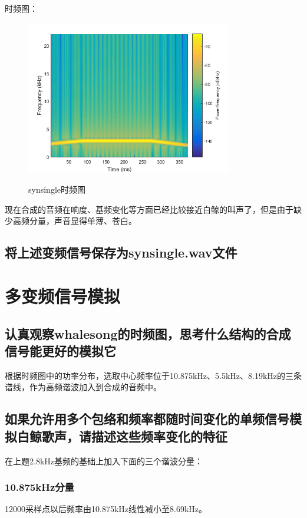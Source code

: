 \documentclass{article}
\begin{document}
            时频图：
            \begin{figure}[H]
                \centering
                \includegraphics[width=9cm]{figure9.png}
                \label{fig:synsingle-ft}\caption{synsingle时频图}
            \end{figure}
            
            现在合成的音频在响度、基频变化等方面已经比较接近白鲸的叫声了，但是由于缺少高频分量，声音显得单薄、苍白。
            
        \subsection{将上述变频信号保存为synsingle.wav文件}
        
    \section{多变频信号模拟}
        \subsection{认真观察whalesong的时频图，思考什么结构的合成信号能更好的模拟它}
            根据时频图中的功率分布，选取中心频率位于10.875kHz、5.5kHz、8.19kHz的三条谱线，作为高频谐波加入到合成的音频中。
            
        \subsection{如果允许用多个包络和频率都随时间变化的单频信号模拟白鲸歌声，请描述这些频率变化的特征}
            在上题2.8kHz基频的基础上加入下面的三个谐波分量：
            \subsubsection*{10.875kHz分量}
                12000采样点以后频率由10.875kHz线性减小至8.69kHz。
\end{document}

